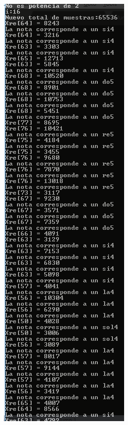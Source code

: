 \begin{figure}[H]
	\begin{center}
		\includegraphics[scale=1]{img/salida1.png}
		\label{fig:wav1}
	\end{center}
\end{figure}
